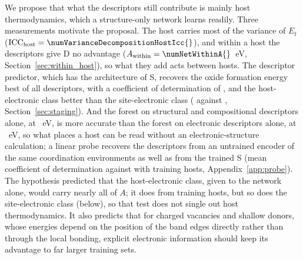 We propose that what the descriptors still contribute is mainly host thermodynamics, which a structure-only network learns readily. Three measurements motivate the proposal. The host carries most of the variance of $E_\mathrm{f}$ ($\mathrm{ICC}_\mathrm{host} = \numVarianceDecompositionHostIcc{}$), and within a host the descriptors give D no advantage ($A_\mathrm{within} = \numNetWithinA{}$~eV, Section~\ref{sec:within_host}), so what they add acts between hosts. The descriptor predictor, which has the architecture of S, recovers the oxide formation energy best of all descriptors, with a coefficient of determination of \numNetStgSixHundredFiftyFourPOneRsqFormation{}, and the host-electronic class better than the site-electronic class (\numNetStgSixHundredFiftyFourPOneRsqHost{} against \numNetStgSixHundredFiftyFourPOneRsqSite{}, Section~\ref{sec:staging}). And the forest on structural and compositional descriptors alone, at \numBaselinesSummaryOuterFullBudgetRfStructuralMaeMean{}~eV, is more accurate than the forest on electronic descriptors alone, at \numBaselinesSummaryOuterFullBudgetRfElectronicMaeMean{}~eV, so what places a host can be read without an electronic-structure calculation; a linear probe recovers the descriptors from an untrained encoder of the same coordination environments as well as from the trained S (mean coefficient of determination \numProbeDescriptiveSVTwoAllCurvesInitZeroSixHundredFiftyFourMean{} against \numNetProbeAllRsqSixHundredFiftyFour{} with \numCfgBudgetsMax{} training hosts, Appendix~\ref{app:probe}). The hypothesis predicted that the host-electronic class, given to the network alone, would carry nearly all of $A$; it does from \numCfgBudgetsHostsItemFive{} training hosts, but so does the site-electronic class (below), so that test does not single out host thermodynamics. It also predicts that for charged vacancies and shallow donors, whose energies depend on the position of the band edges directly rather than through the local bonding, explicit electronic information should keep its advantage to far larger training sets.

